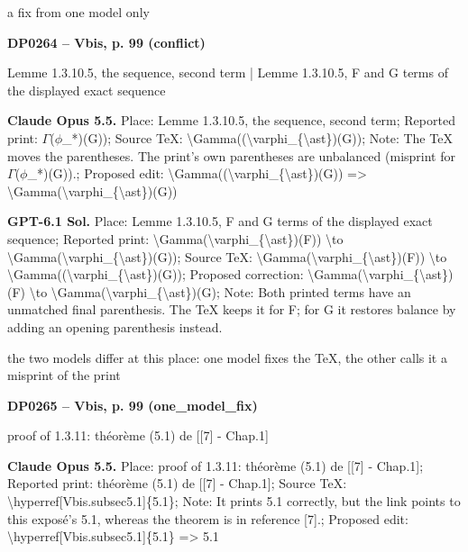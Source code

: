 a fix from one model only\par
\par\noindent\hypertarget{DP0264}{}\textbf{DP0264 -- Vbis, p. 99 (conflict)}\par
Lemme 1.3.10.5, the sequence, second term | Lemme 1.3.10.5, F and G terms of the displayed exact sequence\par
\textbf{Claude Opus 5.5.} Place: Lemme 1.3.10.5, the sequence, second term; Reported print: \ensuremath{\Gamma}(\ensuremath{\phi}\_*)(G)); Source TeX: \textbackslash{}Gamma((\textbackslash{}varphi\_\{\textbackslash{}ast\})(G)); Note: The TeX moves the parentheses. The print's own parentheses are unbalanced (misprint for \ensuremath{\Gamma}(\ensuremath{\phi}\_*)(G)).; Proposed edit: \textbackslash{}Gamma((\textbackslash{}varphi\_\{\textbackslash{}ast\})(G)) =\allowbreak > \textbackslash{}Gamma(\textbackslash{}varphi\_\{\textbackslash{}ast\})(G))\par
\textbf{GPT-6.1 Sol.} Place: Lemme 1.3.10.5, F and G terms of the displayed exact sequence; Reported print: \textbackslash{}Gamma(\textbackslash{}varphi\_\{\textbackslash{}ast\})(F)) \textbackslash{}to \textbackslash{}Gamma(\textbackslash{}varphi\_\{\textbackslash{}ast\})(G)); Source TeX: \textbackslash{}Gamma(\textbackslash{}varphi\_\{\textbackslash{}ast\})(F)) \textbackslash{}to \textbackslash{}Gamma((\textbackslash{}varphi\_\{\textbackslash{}ast\})(G)); Proposed correction: \textbackslash{}Gamma(\textbackslash{}varphi\_\{\textbackslash{}ast\})(F) \textbackslash{}to \textbackslash{}Gamma(\textbackslash{}varphi\_\{\textbackslash{}ast\})(G); Note: Both printed terms have an unmatched final parenthesis. The TeX keeps it for F; for G it restores balance by adding an opening parenthesis instead.\par
the two models differ at this place: one model fixes the TeX, the other calls it a misprint of the print\par
\par\noindent\hypertarget{DP0265}{}\textbf{DP0265 -- Vbis, p. 99 (one\_model\_fix)}\par
proof of 1.3.11: théorème (5.1) de [[7] - Chap.1]\par
\textbf{Claude Opus 5.5.} Place: proof of 1.3.11: théorème (5.1) de [[7] - Chap.1]; Reported print: théorème (5.1) de [[7] - Chap.1]; Source TeX: \textbackslash{}hyperref[Vbis.subsec5.1]\{5.1\}; Note: It prints 5.1 correctly, but the link points to this exposé's 5.1, whereas the theorem is in reference [7].; Proposed edit: \textbackslash{}hyperref[Vbis.subsec5.1]\{5.1\} =\allowbreak > 5.1\par
